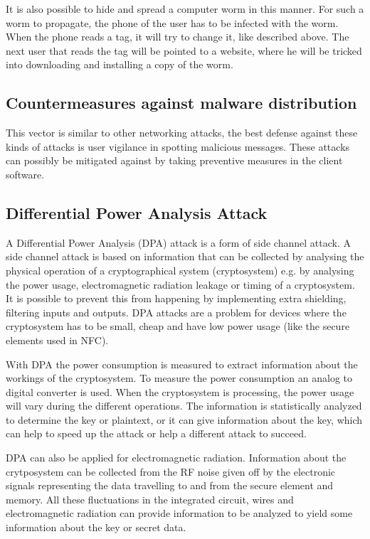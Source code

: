 It is also possible to hide and spread a computer worm in this manner.
For such a worm to propagate, the phone of the user has to be infected with the worm. When the phone reads a tag, it will try to change it, like described above. The next user that reads the tag will be pointed to a website, where he will be tricked into downloading and installing a copy of the worm.

\cite{mulliner2009vulnerability,rieback2006your} 

\subsection{Countermeasures against malware distribution}
This vector is similar to other networking attacks, the best defense against these kinds of attacks is user vigilance in spotting malicious messages.
These attacks can possibly be mitigated against by taking preventive measures in the client software.

\subsection{Differential Power Analysis Attack}
A Differential Power Analysis (DPA) attack is a form of side channel attack.
A side channel attack is based on information that can be collected by analysing the physical operation of a cryptographical system (cryptosystem) e.g. by analysing the power usage, electromagnetic radiation leakage or timing of a cryptosystem.
It is possible to prevent this from happening by implementing extra shielding, filtering inputs and outputs.
DPA attacks are a problem for devices where the cryptosystem has to be small, cheap and have low power usage (like the secure elements used in NFC).

With DPA the power consumption is measured to extract information about the workings of the cryptosystem.
To measure the power consumption an analog to digital converter is used.
When the cryptosystem is processing, the power usage will vary during the different operations.
The information is statistically analyzed to determine the key or plaintext, or it can give information about the key, which can help to speed up the attack or help a different attack to succeed.

DPA can also be applied for electromagnetic radiation.
Information about the crytposystem can be collected from the RF noise given off by the electronic signals representing the data travelling to and from the secure element and memory.
All these fluctuations in the integrated circuit, wires and electromagnetic radiation can provide information to be analyzed to yield some information about the key or secret data.

